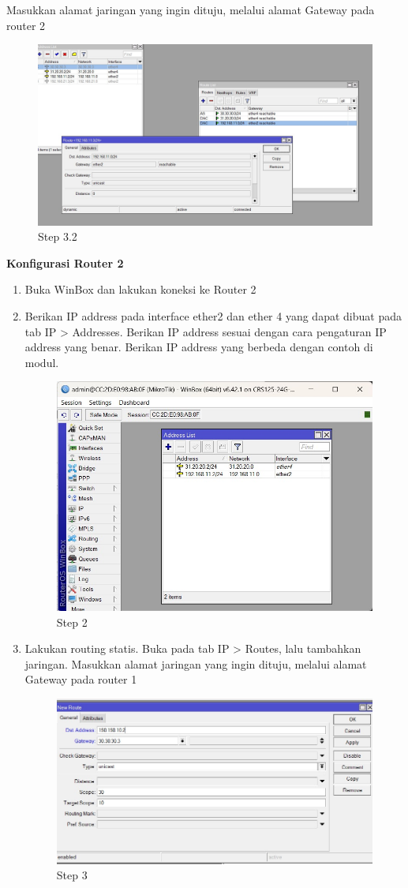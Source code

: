 \begin{enumerate}
	Masukkan alamat jaringan yang ingin dituju, melalui alamat Gateway pada router 2
	
	\begin{figure}[H]
		\centering
		\includegraphics[width=0.5\linewidth]{P2/img/statis_R1step3.2.jpg}
		\caption{Step 3.2}
		\label{fig:gambar4}
	\end{figure}

\end{enumerate}

\begin{center} 
	\textbf{Konfigurasi Router 2}
\end{center}

\begin{enumerate}
	\item Buka WinBox dan lakukan koneksi ke Router 2

	\item Berikan IP address pada interface ether2 dan ether 4 yang dapat dibuat pada tab IP > Addresses. Berikan IP address sesuai dengan cara pengaturan IP address yang benar. Berikan IP
	address yang berbeda dengan contoh di modul.
	\begin{figure}[H]
		\centering
		\includegraphics[width=0.5\linewidth]{P2/img/statis_R1step1.jpg}
		\caption{Step 2}
		\label{fig:gambar6}
	\end{figure}

	\item Lakukan routing statis. Buka pada tab IP > Routes, lalu tambahkan jaringan. Masukkan alamat
	jaringan yang ingin dituju, melalui alamat Gateway pada router 1
	\begin{figure}[H]
		\centering
		\includegraphics[width=0.5\linewidth]{P2/img/statis_R1step3.jpg}
		\caption{Step 3}
		\label{fig:gambar7}
	\end{figure}

\end{enumerate}

